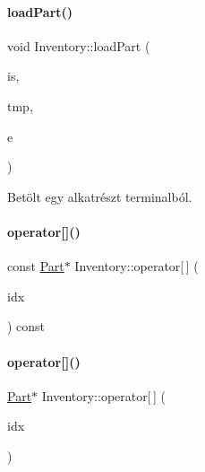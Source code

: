 \paragraph{\texorpdfstring{loadPart()}{loadPart()}\hspace{0.1cm}{\footnotesize\ttfamily [2/2]}}
{\footnotesize\ttfamily void Inventory\+::load\+Part (\begin{DoxyParamCaption}\item[{std\+::istream \&}]{is,  }\item[{\mbox{\hyperlink{struct_temp_input}{Temp\+Input}} \&}]{tmp,  }\item[{\mbox{\hyperlink{_parts_8h_abddff37837f171d72a2e16a1448a3943}{enum\+Part}}}]{e }\end{DoxyParamCaption})}



Betölt egy alkatrészt terminalból. 

\mbox{\label{class_inventory_a99b8be25beb3530c47d1faa913633979}} 
\paragraph{\texorpdfstring{operator[]()}{operator[]()}\hspace{0.1cm}{\footnotesize\ttfamily [1/2]}}
{\footnotesize\ttfamily const \mbox{\hyperlink{class_part}{Part}}$\ast$ Inventory\+::operator\mbox{[}$\,$\mbox{]} (\begin{DoxyParamCaption}\item[{int}]{idx }\end{DoxyParamCaption}) const\hspace{0.3cm}{\ttfamily [inline]}}

\mbox{\label{class_inventory_a86601b8ee999e78cdeea83431bab8f33}} 
\paragraph{\texorpdfstring{operator[]()}{operator[]()}\hspace{0.1cm}{\footnotesize\ttfamily [2/2]}}
{\footnotesize\ttfamily \mbox{\hyperlink{class_part}{Part}}$\ast$ Inventory\+::operator\mbox{[}$\,$\mbox{]} (\begin{DoxyParamCaption}\item[{int}]{idx }\end{DoxyParamCaption})\hspace{0.3cm}{\ttfamily [inline]}}

